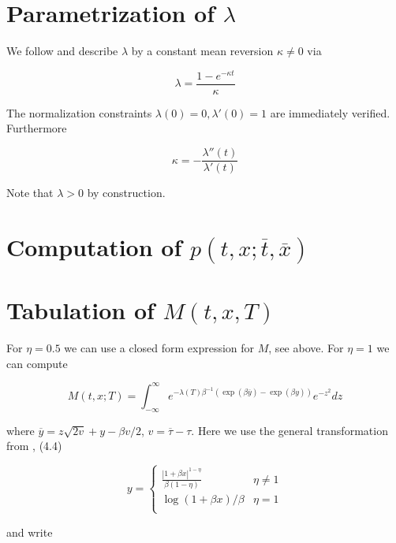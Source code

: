 \documentclass{amsart}
\theoremstyle{plain}
\numberwithin{equation}{section}
\begin{document}
\section{Parametrization of $\lambda$}

We follow \cite{piterbarg} and describe $\lambda$ by a constant mean reversion $\kappa \neq 0$ via

\begin{equation}
\lambda = \frac{1 - e^{-\kappa t}}{\kappa}
\end{equation}

The normalization constraints $\lambda(0)=0, \lambda'(0)=1$ are immediately verified. Furthermore

\begin{equation}
\kappa = -\frac{\lambda''(t)}{\lambda'(t)}
\end{equation}

Note that $\lambda > 0$ by construction.

\section{Computation of $p(t,x;\overline{t},\overline{x})$}




\section{Tabulation of $M(t,x,T)$}

For $\eta=0.5$ we can use a closed form expression for $M$, see above. For $\eta=1$ we can compute

\begin{equation}
M(t,x;T) = \int_{-\infty}^\infty e^{-\lambda(T)\beta^{-1} (\exp(\beta \overline{y}) - \exp(\beta y))} e^{-z^2} dz
\end{equation}

where $\overline{y} = z\sqrt{2v} + y - \beta v / 2$, $v=\overline{\tau}-\tau$. Here we use the general transformation from \cite{betaeta}, (4.4)

\begin{equation}
y = \begin{cases}
\frac{|1+\beta x|^{1-\eta}}{\beta(1-\eta)} & \eta\neq 1 \\
\log(1+\beta x)/\beta & \eta=1 \\
\end{cases}
\end{equation}

and write 
\end{document}
